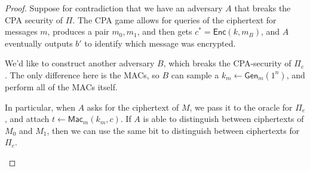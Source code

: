 \documentclass[12pt]{tufte-book}
\begin{document}
\begin{proof}
    Suppose for contradiction that we have an adversary $A$ that breaks the CPA security of $\Pi$. The CPA game allows for queries of the ciphertext for messages $m$, produces a pair $m_0, m_1$, and then gets $c^* = \mathsf{Enc}(k, m_B)$, and $A$ eventually outputs $b'$ to identify which message was encrypted.

    We'd like to construct another adversary $B$, which breaks the CPA-security of $\Pi_e$. The only difference here is the MACs, so $B$ can sample a $k_m \gets \mathsf{Gen}_m(1^n)$, and perform all of the MACs itself.

    In particular, when $A$ asks for the ciphertext of $M$, we pass it to the oracle for $\Pi_e$, and attach $t \gets \mathsf{Mac}_m(k_m, c)$. If $A$ is able to distinguish between ciphertexts of $M_0$ and $M_1$, then we can use the same bit to distinguish between ciphertexts for $\Pi_e$.
    \begin{center}
    \end{center}


\end{proof}
\end{document}
